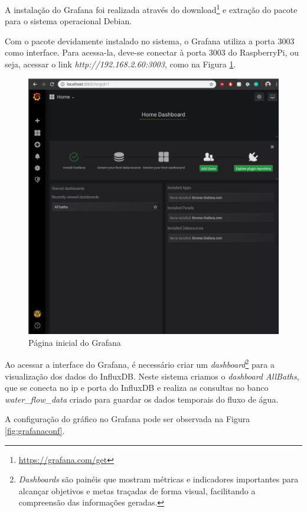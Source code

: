 A instalação do Grafana foi realizada através do download\footnote{\url{https://grafana.com/get}} e extração do pacote para o sistema operacional Debian.

Com o pacote devidamente instalado no sistema, o Grafana utiliza a porta 3003 como interface. Para acessa-la, deve-se conectar à porta 3003 do RaspberryPi, ou seja, acessar o link \textit{http://192.168.2.60:3003}, como na Figura \ref{fig:grafanahome}.

\begin{figure}[htbp]
	\centering
	\includegraphics[width=1\linewidth]{figuras/grafanahome.png}
	\caption{Página inicial do Grafana}
	\label{fig:grafanahome}
\end{figure}

Ao acessar a interface do Grafana, é necessário criar um \textit{dashboard}\footnote{\textit{Dashboards} são painéis que mostram métricas e indicadores importantes para alcançar objetivos e metas traçadas de forma visual, facilitando a compreensão das informações geradas.} para a visualização dos dados do InfluxDB. Neste sistema criamos o \textit{dashboard AllBaths}, que se conecta no ip e porta do InfluxDB e realiza as consultas no banco \textit{water\_flow\_data} criado para guardar os dados temporais do fluxo de água.

A configuração do gráfico no Grafana pode ser observada na Figura \ref{fig:grafanaconf}.

